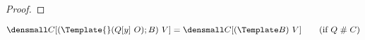 \begin{proof}
\end{proof}

\begin{lemma}
  \label{thm:context-apart}

  $\den{C[(\Template{} (Q[y] ~ O); B) ~ V]} = \den{C[(\Template B) ~ V]}
  \qquad (\text{if } Q \apart C)$
\end{lemma}
